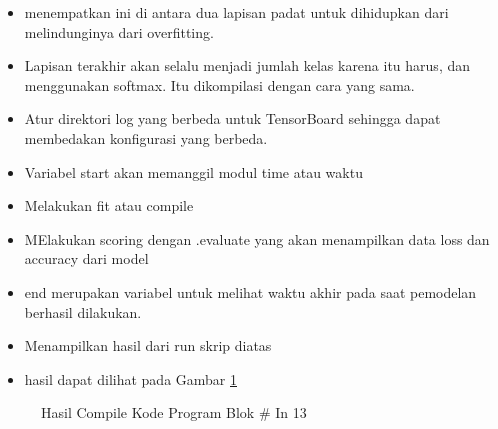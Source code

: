 \begin{enumerate}
\begin{itemize}
\item menempatkan ini di antara dua lapisan padat untuk dihidupkan dari melindunginya dari overfitting.
\item  Lapisan terakhir akan selalu menjadi jumlah kelas karena itu harus, dan menggunakan softmax. Itu dikompilasi dengan cara yang sama.
\item Atur direktori log yang berbeda untuk TensorBoard sehingga dapat membedakan konfigurasi yang berbeda.
\item Variabel start akan memanggil modul time atau waktu
\item Melakukan fit atau compile 
\item MElakukan scoring dengan .evaluate yang akan menampilkan data loss dan accuracy dari model
\item end merupakan variabel untuk melihat waktu akhir pada saat pemodelan berhasil dilakukan.
\item Menampilkan hasil dari run skrip diatas
\item hasil dapat dilihat pada Gambar \ref{refer24}
\end{itemize}

\begin{figure}[!htbp]
      \caption{Hasil Compile Kode Program Blok \# In 13}
      \label{refer24}
\end{figure}


\end{enumerate}
